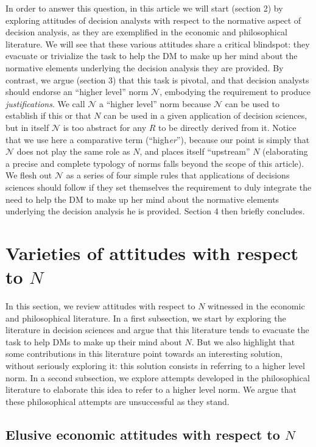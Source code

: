 \documentclass[preprint, french, english, 11pt, authoryear]{elsarticle}%
\newcommand{\protectforpdf}[1]{\texorpdfstring{\ensuremath{#1}}{#1}}
\newcommand{\adv}{\mathscr{N}}
\begin{document}
In order to answer this question, in this article we will start (section 2) by exploring attitudes of decision analysts with respect to the normative aspect of decision analysis, as they are exemplified in the economic and philosophical literature. We will see that these various attitudes share a critical blindspot: they evacuate or trivialize the task to help the \ac{DM} to make up her mind about the normative elements underlying the decision analysis they are provided. By contrast, we argue (section 3) that this task is pivotal, and that decision analysts should endorse an “higher level” norm $\adv$, embodying the requirement to produce \emph{justifications}. We call $\adv$ a “higher level” norm because $\adv$ can be used to establish if this or that $N$ can be used in a given application of decision sciences, but in itself $\adv$ is too abstract for any $R$ to be directly derived from it. Notice that we use here a comparative term (“high\emph{er}”), because our point is simply that $\adv$ does not play the same role as $N$, and places itself “upstream” $N$ (elaborating a precise and complete typology of norms falls beyond the scope of this article). We flesh out $\adv$ as a series of four simple rules that applications of decisions sciences should follow if they set themselves the requirement to duly integrate the need to help the \ac{DM} to make up her mind about the normative elements underlying the decision analysis he is provided. Section 4 then briefly concludes.

\section{Varieties of attitudes with respect to \protectforpdf{N}}
\label{sec:existing}
In this section, we review attitudes with respect to $N$ witnessed in the economic and philosophical literature. In a first subsection, we start by exploring the literature in decision sciences and argue that this literature tends to evacuate the task to help \acp{DM} to make up their mind about $N$. But we also highlight that some contributions in this literature point towards an interesting solution, without seriously exploring it: this solution consists in referring to a higher level norm. In a second subsection, we explore attempts developed in the philosophical literature to elaborate this idea to refer to a higher level norm. We argue that these philosophical attempts are unsuccessful as they stand.

\subsection{Elusive economic attitudes with respect to \protectforpdf{N}}
\end{document}
